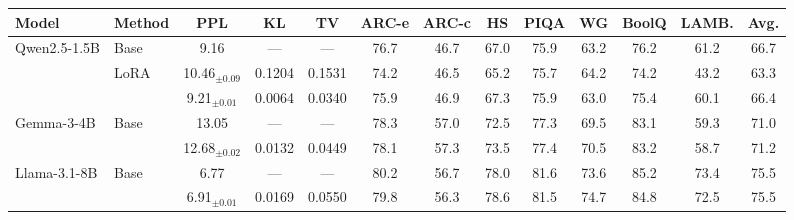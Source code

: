   \footnotesize\setlength{\tabcolsep}{4pt}
  \begin{tabular}{@{}llccccccccccc@{}}
    \toprule
    Model & Method & PPL & KL & TV & ARC-e & ARC-c & HS & PIQA & WG & BoolQ & LAMB. & Avg. \\
    \midrule
    Qwen2.5-1.5B & Base & 9.16 & --- & --- & 76.7 & 46.7 & 67.0 & 75.9 & 63.2 & 76.2 & 61.2 & 66.7 \\
     & LoRA & 10.46$_{\pm 0.09}$ & 0.1204 & 0.1531 & 74.2 & 46.5 & 65.2 & 75.7 & 64.2 & 74.2 & 43.2 & 63.3 \\
     & \PEAT{} & 9.21$_{\pm 0.01}$ & 0.0064 & 0.0340 & 75.9 & 46.9 & 67.3 & 75.9 & 63.0 & 75.4 & 60.1 & 66.4 \\
    \midrule
    Gemma-3-4B & Base & 13.05 & --- & --- & 78.3 & 57.0 & 72.5 & 77.3 & 69.5 & 83.1 & 59.3 & 71.0 \\
     & \PEAT{} & 12.68$_{\pm 0.02}$ & 0.0132 & 0.0449 & 78.1 & 57.3 & 73.5 & 77.4 & 70.5 & 83.2 & 58.7 & 71.2 \\
    \midrule
    Llama-3.1-8B & Base & 6.77 & --- & --- & 80.2 & 56.7 & 78.0 & 81.6 & 73.6 & 85.2 & 73.4 & 75.5 \\
     & \PEAT{} & 6.91$_{\pm 0.01}$ & 0.0169 & 0.0550 & 79.8 & 56.3 & 78.6 & 81.5 & 74.7 & 84.8 & 72.5 & 75.5 \\
    \bottomrule
  \end{tabular}
